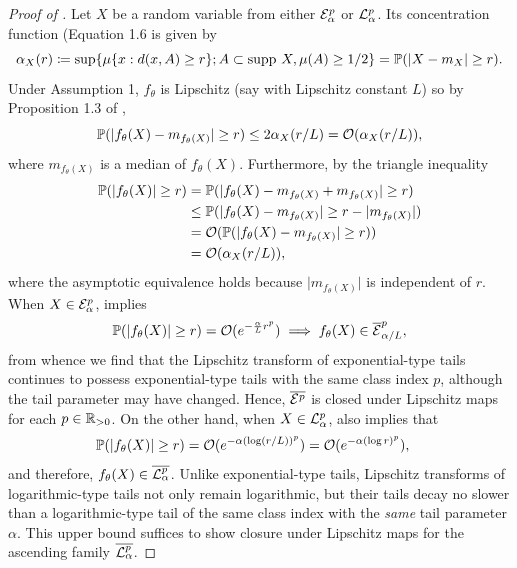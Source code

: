 \documentclass[nohyperref]{article}
\theoremstyle{plain}
\theoremstyle{definition}
\theoremstyle{remark}
\begin{document}
\begin{proof}[Proof of ]
  \label{proof:distn_class_closed}
  Let $X$ be a random variable from either $\mathcal{E}_\alpha^p$
  or $\mathcal{L}_\alpha^p$.
  Its concentration function
  (Equation 1.6 \citet{ledoux2001concentration}
  is given by
  \[
    \alpha_X(r)
    \coloneqq \sup \{ \mu\{x : d(x,A) \geq r\}; A \subset \text{supp}~X, \mu(A) \geq 1/2\}
    = \mathbb{P}(\lvert X - m_X \rvert \geq r) .
  \]
  Under Assumption 1, $f_\theta$ is Lipschitz (say with Lipschitz
  constant $L$) so by Proposition 1.3 of \citet{ledoux2001concentration},
  \[
    \mathbb{P}(\lvert f_\theta(X) - m_{f_\theta(X)}\rvert \geq r)
    \leq 2 \alpha_X(r/L)
    = \mathcal{O}(\alpha_X(r/L)),
  \]
  where $m_{f_\theta(X)}$ is a median of $f_\theta(X)$.
  Furthermore, by the triangle inequality
  \begin{align}
    \mathbb{P}(\lvert f_\theta(X) \rvert \geq r)
    &= \mathbb{P}(\lvert f_\theta(X) - m_{f_\theta(X)} + m_{f_\theta(X)} \rvert \geq r) \nonumber\\
    &\leq \mathbb{P}(\lvert f_\theta(X) - m_{f_\theta(X)}\rvert \geq r - \lvert m_{f_\theta(X)}\rvert ) \nonumber\\
    &= \mathcal{O}(\mathbb{P}(\lvert f_\theta(X) - m_{f_\theta(X)}\rvert \geq r)) \nonumber\\
    &= \mathcal{O}(\alpha_X(r/L)) ,
    \label{eq:pushforward-conc-fn}
  \end{align}
  where the asymptotic equivalence holds because $\lvert m_{f_\theta(X)} \rvert$ is independent of $r$.
  When $X \in \mathcal{E}_\alpha^p$,  implies
  \[
    \mathbb{P}(\lvert f_\theta(X) \rvert \geq r)
    = \mathcal{O}(e^{-\frac{\alpha}{L} r^p}) \implies f_\theta(X) \in \overline{\mathcal{E}}_{\alpha/L}^p,
  \]
  from whence we find that the Lipschitz transform of exponential-type
  tails continues to possess exponential-type tails with the same
  class index $p$, although the tail parameter may have changed. Hence,
  $\overline{\mathcal{E}^p}$ is closed under Lipschitz maps for each $p \in \mathbb{R}_{>0}$.
  On the other hand, when $X \in \mathcal{L}_\alpha^p$,  also implies that
  \begin{align*}
    \mathbb{P}(\lvert f_\theta(X) \rvert \geq r)
    &= \mathcal{O}(e^{-\alpha (\log (r/L))^p})
    = \mathcal{O}(e^{-\alpha (\log r)^p}),
  \end{align*}
  and therefore, $f_\theta(X) \in \overline{\mathcal{L}_\alpha^p}$.
  Unlike exponential-type tails, Lipschitz transforms of
  logarithmic-type tails not only remain logarithmic, but
  their tails decay no slower than a logarithmic-type tail
  of the same class index with the \emph{same} tail parameter $\alpha$.
  This upper bound suffices to show closure under Lipschitz maps for the
  ascending family $\overline{\mathcal{L}_\alpha^p}$.
\end{proof}
\end{document}
